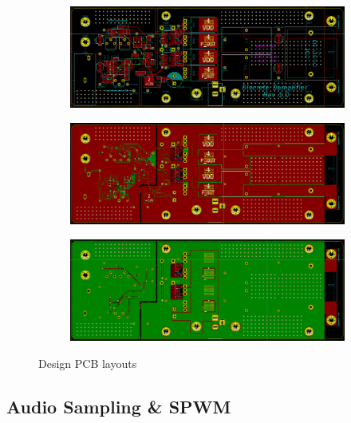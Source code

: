 \documentclass[a4paper,11pt]{article}
\begin{document}
\begin{figure}[h!]
    \centering
    \begin{subfigure}{0.8\textwidth}
        \includegraphics[width=\columnwidth]{pcb/traces.png}
        \label{F:PCB_traces}
    \end{subfigure}
    \begin{subfigure}{0.8\textwidth}
        \includegraphics[width=\columnwidth]{pcb/top_layer.png}
        \label{F:PCB_top}
    \end{subfigure}
    \begin{subfigure}{0.8\textwidth}
        \includegraphics[width=\columnwidth]{pcb/bottom_layer.png}
        \label{F:PCB_bottom}
    \end{subfigure}
    \caption{Design PCB layouts}
    \label{F:PCB}
\end{figure}

\subsection{Audio Sampling \& SPWM}
\end{document}

